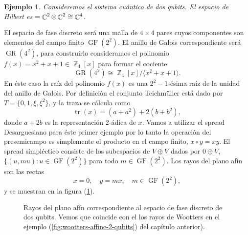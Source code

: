 \documentclass[a4paper]{report}
\DeclareMathOperator{\C}{\mathbb{C}}
\DeclareMathOperator{\Z}{\mathbb{Z}}
\let\H\relax
\DeclareMathOperator{\H}{\mathcal H}
\DeclareMathOperator{\tr}{tr}
\DeclareMathOperator{\GF}{GF}
\DeclareMathOperator{\GR}{GR}
\newtheorem{example}{Ejemplo}
\begin{document}
  \begin{example}
    Consideremos el sistema cuántico de dos qubits. El
    espacio de Hilbert es $\H = \C^2 \otimes \C^2 \cong
    \C^{4}$. 
  \end{example}
  El espacio de fase discreto será una malla de
  $4 \times 4$ pares cuyos componentes son elementos del
  campo finito $\GF(2^2)$. El anillo de Galois
  correspondiente será $\GR(4^{2})$, para construirlo
  consideramos el polinomio $f(x) = x^2+x+1 \in \Z_4[x]$
  para formar el cociente
  \[
    \GR(4^2) \cong \Z_4[x] / \langle x^2+x+1 \rangle.
  \] 
  En éste caso la raíz del polinomio $f(x)$ es una
  $2^{2}-1$-ésima raíz de la unidad del anillo de Galois.
  Por definición el conjunto Teichmüller está dado por $T =
  \{0,1,\xi,\xi^2\}$, y la traza se cálcula como
  \[
    \tr(x) = (a + a^2) + 2(b + b^2),
  \] 
  donde $a + 2b$ es la representación $2$-ádica de $x$.
  Vamos a utilizar el spread Desarguesiano para éste primer
  ejemplo por lo tanto la operación del presemicampo es
  simplemente el producto en el campo finito, $x \circ y =
  xy$. El spread simpléctico consiste de los subespacios de
  $V \oplus V$ dados por $0 \oplus V$, $\{(u, mu) : u \in
  \GF(2^2)\}$ para todo $m \in \GF(2^2)$.  Los rayos del
  plano afín son las rectas
  \[
    x = 0,
    \quad
    y = mx, \quad m \in \GF(2^2),
  \] 
  y se muestran en la figura (\ref{fig:2-2-desargues-plane}).
  \begin{figure}[ht]
    \centering
    \scalebox{0.8}{
      
    }
    \caption{Rayos del plano afín correspondiente al espacio
    de fase discreto de dos qubits. Vemos que coincide con
    el los rayos de Wootters en el ejemplo
    (\ref{fig:wootters-affine-2-qubits}) del capítulo
    anterior).}
    \label{fig:2-2-desargues-plane}
  \end{figure}
\end{document}
